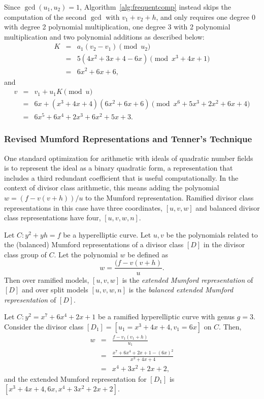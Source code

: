 Since $\gcd(u_1,u_2) = 1$, Algorithm~\ref{alg:frequentcomp} instead skips the
computation of the second $\gcd$ with $v_1 + v_2 + h$, and only requires one
degree 0 with degree 2 polynomial multiplication, one degree 3 with 2 polynomial
multiplication and two polynomial additions as described below:
\begin{eqnarray*}
    K &=& a_1(v_2 - v_1) \pmod{u_2}\\
      &=& 5(4x^2 + 3x + 4 - 6x ) \pmod{x^3 + 4x + 1}\\
      &=& 6x^2 + 6x + 6,
\end{eqnarray*}
and \begin{eqnarray*}
    v &=& v_1 + u_1K \pmod{u}\\
      &=& 6x + (x^3 + 4x + 4)(6x^2 + 6x + 6) \pmod{x^6 + 5x^3 + 2x^2 + 6x + 4}\\
      &=& 6x^5 + 6x^4 + 2x^3 + 6x^2 + 5x + 3.
\end{eqnarray*}

\ee

\subsubsection{Revised Mumford Representations and Tenner's Technique}\label{sec:tenner}
One standard optimization for arithmetic with ideals of quadratic number fields
is to represent the ideal as a binary quadratic form, a representation that
includes a third redundant coefficient that is useful computationally.  In the
context of divisor class arithmetic, this means adding the polynomial $w = (f -
v(v+ h))/u$ to the Mumford representation. Ramified divisor class
representations in this case have three coordinates, $[u,v,w]$ and balanced
divisor class representations have four, $[u,v,w,n]$.

\bd\label{def:extended}
Let $C : y^2 + yh = f$ be a hyperelliptic curve. Let $u,v$ be the polynomials
related to the (balanced) Mumford representations of a divisor class $[D]$ in
the divisor class group of $C$. Let the polynomial $w$ be defined as  $$w =
\frac{(f - v(v+ h)}{u}.$$ Then over ramified models, $[u,v,w]$ is the
\emph{extended Mumford representation} of $[D]$ and over split models
$[u,v,w,n]$ is the \emph{balanced extended Mumford representation} of $[D]$.
\ed

\be
Let $C : y^2 = x^7 + 6x^4 + 2x + 1$ be a ramified hyperelliptic curve with genus
$g=3$. Consider the divisor class $[D_1] = [u_1 = x^3 + 4x + 4,v_1 = 6x ]$ on $C$. Then,
\begin{eqnarray*}
    w &=& \frac{f - v_1(v_1 + h)}{u_1}\\
      &=& \frac{x^7 + 6x^4 + 2x + 1 - (6x)^2}{x^3 + 4x + 4}\\
      &=& x^4 + 3x^2 + 2x + 2, \end{eqnarray*} and the extended Mumford
representation for $[D_1]$ is $[x^3 + 4x + 4, 6x,x^4 + 3x^2 + 2x + 2]$.
\ee


